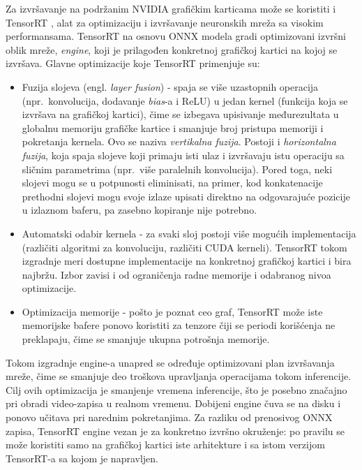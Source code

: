\documentclass[12pt,a4paper]{article}
\begin{document}
Za izvršavanje na podržanim NVIDIA grafičkim karticama može se koristiti i TensorRT \cite{TensorRT}, alat za optimizaciju i izvršavanje neuronskih mreža sa visokim performansama. TensorRT na osnovu ONNX modela gradi optimizovani izvršni oblik mreže, \textit{engine}, koji je prilagođen konkretnoj grafičkoj kartici na kojoj se izvršava. Glavne optimizacije koje TensorRT primenjuje su:
\begin{itemize}[itemsep=0pt]
	\item Fuzija slojeva (engl. \textit{layer fusion}) - spaja se više uzastopnih operacija (npr.\ konvolucija, dodavanje \textit{bias}-a i ReLU) u jedan kernel (funkcija koja se izvršava na grafičkoj kartici), čime se izbegava upisivanje međurezultata u globalnu memoriju grafičke kartice i smanjuje broj pristupa memoriji i pokretanja kernela. Ovo se naziva \textit{vertikalna fuzija}. Postoji i \textit{horizontalna fuzija}, koja spaja slojeve koji primaju isti ulaz i izvršavaju istu operaciju sa sličnim parametrima (npr.\ više paralelnih konvolucija). Pored toga, neki slojevi mogu se u potpunosti eliminisati, na primer, kod konkatenacije prethodni slojevi mogu svoje izlaze upisati direktno na odgovarajuće pozicije u izlaznom baferu, pa zasebno kopiranje nije potrebno.

	\item Automatski odabir kernela - za svaki sloj postoji više mogućih implementacija (različiti algoritmi za konvoluciju, različiti CUDA kerneli). TensorRT tokom izgradnje meri dostupne implementacije na konkretnoj grafičkoj kartici i bira najbržu. Izbor zavisi i od ograničenja radne memorije i odabranog nivoa optimizacije.

	\item Optimizacija memorije - pošto je poznat ceo graf, TensorRT može iste memorijske bafere ponovo koristiti za tenzore čiji se periodi korišćenja ne preklapaju, čime se smanjuje ukupna potrošnja memorije.
\end{itemize}

Tokom izgradnje engine-a unapred se određuje optimizovani plan izvršavanja mreže, čime se smanjuje deo troškova upravljanja operacijama tokom inferencije. Cilj ovih optimizacija je smanjenje vremena inferencije, što je posebno značajno pri obradi video-zapisa u realnom vremenu. Dobijeni engine čuva se na disku i ponovo učitava pri narednim pokretanjima. Za razliku od prenosivog ONNX zapisa, TensorRT engine vezan je za konkretno izvršno okruženje: po pravilu se može koristiti samo na grafičkoj kartici iste arhitekture i sa istom verzijom TensorRT-a sa kojom je napravljen.
\end{document}
